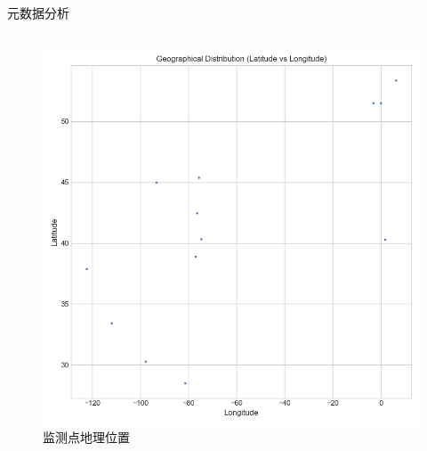 \documentclass{beamer} %
\begin{document}
\begin{frame}{元数据分析}
\begin{columns}
\begin{column}{0.48\textwidth}
\begin{figure}
                \includegraphics[width=\textwidth]{../plots/metadata_location_scatter.png}
                \caption{监测点地理位置}
            \end{figure}
        \end{column}
    \end{columns}
\end{frame}

\end{document}
